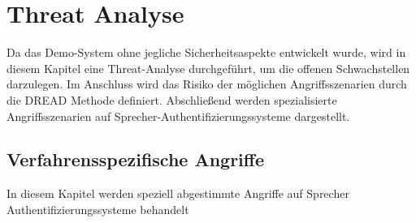 \section{Threat Analyse}
Da das Demo-System ohne jegliche Sicherheitsaspekte entwickelt wurde, wird in diesem Kapitel eine Threat-Analyse durchgeführt, um die offenen Schwachstellen darzulegen.
Im Anschluss wird das Risiko der möglichen Angriffsszenarien durch die DREAD Methode definiert.
Abschließend werden spezialisierte Angriffsszenarien auf Sprecher-Authentifizierungssysteme dargestellt.

\subsection{Verfahrensspezifische Angriffe}
In diesem Kapitel werden speziell abgestimmte Angriffe auf Sprecher Authentifizierungssysteme behandelt